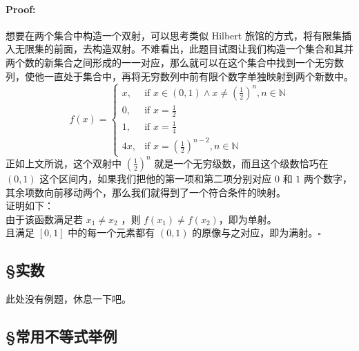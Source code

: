\documentclass{article}
\begin{document}
\paragraph{Proof:}
想要在两个集合中构造一个双射，可以思考类似 Hilbert 旅馆的方式，将有限集插入无限集的前面，去构造双射。不难看出，此题目试图让我们构造一个集合和其并两个数的新集合之间形成的一一对应，那么就可以在这个集合中找到一个无穷数列，使他一直处于集合中，再将无穷数列中前有限个数字单独映射到两个新数中。\\
\[
f(x) =
\begin{cases}
    x,  & \text{if } x \in (0, 1) \land x \neq (\frac{1}{2})^n, n \in \mathbb{N} \\
    0,  & \text{if } x = \frac{1}{2} \\
    1,  & \text{if } x = \frac{1}{4} \\
    4x, & \text{if } x = (\frac{1}{2})^{n - 2}, n \in \mathbb{N}
\end{cases}
\]
正如上文所说，这个双射中 $(\frac{1}{2})^n$ 就是一个无穷级数，而且这个级数恰巧在 $(0, 1)$ 这个区间内，如果我们把他的第一项和第二项分别对应 $0$ 和 $1$ 两个数字，其余项数向前移动两个，那么我们就得到了一个符合条件的映射。\\
证明如下：\\
由于该函数满足若 $x_1 \neq x_2$ ，则 $f(x_1) \neq f(x_2)$，即为单射。\\
且满足 $[0, 1]$ 中的每一个元素都有 $(0, 1)$ 的原像与之对应，即为满射。$\square$ \\
\subsection{\S 实数}
此处没有例题，休息一下吧。
\subsection{\S 常用不等式举例}
\end{document}
